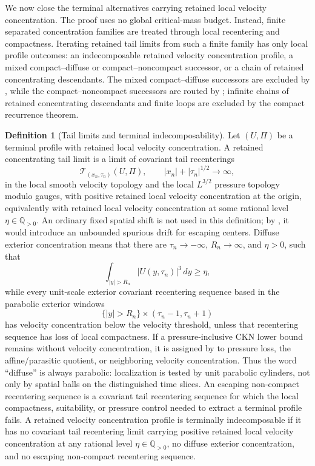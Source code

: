 \documentclass[11pt]{amsart}
\numberwithin{equation}{section}
\theoremstyle{plain}
\theoremstyle{definition}
\newtheorem{definition}[definition]{Definition}
\theoremstyle{remark}
\begin{document}
We now close the terminal alternatives carrying retained local velocity concentration.
The proof uses no global critical-mass budget.  Instead, finite separated
concentration families are treated
through local recentering and compactness.  Iterating retained tail limits from
such a finite family has only local profile outcomes: an indecomposable
retained velocity concentration profile, a mixed compact--diffuse or compact--noncompact
successor, or a chain of retained concentrating descendants.  The mixed
compact--diffuse successors are excluded by ,
while the compact--noncompact successors are routed by
; infinite chains of retained concentrating descendants and finite
loops are excluded by the compact recurrence theorem.

\begin{definition}[Tail limits and terminal indecomposability]
\label{def:atomic-terminal-profile}
Let \((U,\Pi)\) be a terminal profile with retained local velocity concentration.  A
retained concentrating tail limit is a limit of covariant tail recenterings
\[
   \mathscr T_{(x_n,\tau_n)}(U,\Pi),
   \qquad |x_n|+|\tau_n|^{1/2}\to\infty,
\]
   in the local smooth velocity topology and the local \(L^{3/2}\) pressure
   topology modulo gauges, with positive retained local velocity concentration
   at the origin, equivalently with retained local velocity concentration at
   some rational level \(\eta\in\mathbb Q_{>0}\).  An ordinary fixed spatial
   shift is not used in this definition; by
   , it would introduce an
   unbounded spurious drift for escaping centers.  Diffuse exterior concentration
   means that there are \(\tau_n\to-\infty\), \(R_n\to\infty\), and \(\eta>0\),
   such that
  \[
     \int_{|y|>R_n}|U(y,\tau_n)|^3\,dy\ge\eta,
  \]
   while every unit-scale exterior covariant recentering sequence based in the
   parabolic exterior windows
   \[
      \{|y|>R_n\}\times(\tau_n-1,\tau_n+1)
   \]
   has velocity concentration below the velocity threshold, unless that
   recentering sequence has loss of local compactness.  If a pressure-inclusive
   CKN lower bound remains without velocity concentration, it is assigned by
    to pressure loss, the
   affine/parasitic quotient, or neighboring velocity concentration.
   Thus the word ``diffuse'' is always parabolic: localization is tested by
   unit parabolic cylinders, not only by spatial balls on the distinguished time
   slices.  An escaping non-compact recentering sequence is a
   covariant tail recentering sequence for which the local compactness,
suitability, or pressure control needed to extract a terminal profile fails.  A
retained velocity concentration profile is terminally indecomposable if it has
no covariant tail recentering limit carrying positive retained local velocity
concentration at any rational level \(\eta\in\mathbb Q_{>0}\), no diffuse
exterior concentration, and no escaping non-compact recentering sequence.
\end{definition}
\end{document}
